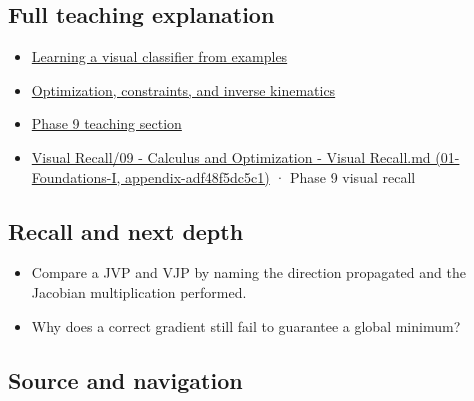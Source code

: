\subsection{Full teaching explanation}\label{full-teaching-explanation}

\begin{itemize}
\tightlist
\item
  \href{Continuous\%20Notes/University\%20-\%20Worlds,\%20Images\%20and\%20Inference\%20-\%20Graphics,\%20Vision\%20and\%20Photography\#Learning\%20a\%20visual\%20classifier\%20from\%20examples}{Learning a visual classifier from examples}
\item
  \href{Continuous\%20Notes/University\%20-\%20Worlds,\%20Images\%20and\%20Inference\%20-\%20Graphics,\%20Vision\%20and\%20Photography\#Optimization,\%20constraints,\%20and\%20inverse\%20kinematics}{Optimization, constraints, and inverse kinematics}
\item
  \href{Continuous\%20Notes/Computing\%20Foundations\%20-\%20From\%20Bits\%20to\%20C++\%20and\%20Systems\%20APIs\#Numerical\%20differentiation\%20and\%20automatic\%20differentiation}{Phase 9 teaching section}
\item
  \href{}{Visual Recall/09 - Calculus and Optimization - Visual Recall.md (01-Foundations-I, appendix-adf48f5dc5c1)} · Phase 9 visual recall
\end{itemize}

\subsection{Recall and next depth}\label{recall-and-next-depth}

\begin{itemize}
\tightlist
\item
  Compare a JVP and VJP by naming the direction propagated and the Jacobian multiplication performed.
\item
  Why does a correct gradient still fail to guarantee a global minimum?
\end{itemize}

\subsection{Source and navigation}\label{source-and-navigation}

